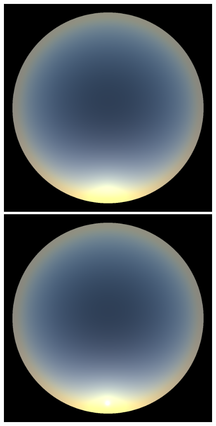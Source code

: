 \begin{figure}
{ }
 \subtop
 {
 \includegraphics[scale=0.125]{figures/preetham_3.png}
 }
 \subtop
 {
 \includegraphics[scale=0.125]{figures/preetham_solar_disk_3.png}
 }
 \subtop
 {
}
\end{figure}
